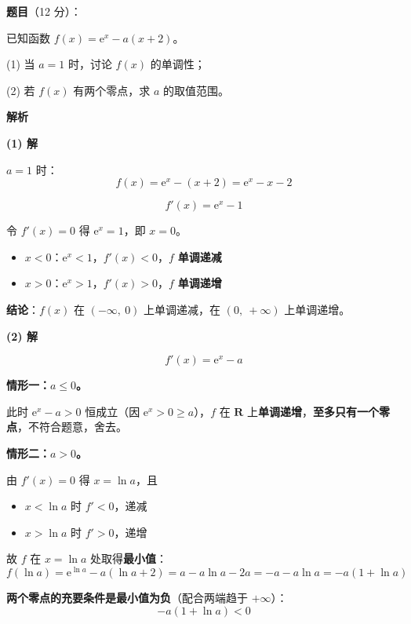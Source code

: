 \begin{answer}

\textbf{题目}（12 分）：

已知函数 $f(x)=\mathrm e^{x}-a(x+2)$。

  (1) 当 $a=1$ 时，讨论 $f(x)$ 的单调性；

  (2) 若 $f(x)$ 有两个零点，求 $a$ 的取值范围。

\textbf{解析}

\par\medskip

\textbf{(1) 解}

$a=1$ 时：
\nopagebreak[4]
\[f(x)=\mathrm e^{x}-(x+2)=\mathrm e^{x}-x-2\]

\nopagebreak[4]
\[f'(x)=\mathrm e^{x}-1\]

令 $f'(x)=0$ 得 $\mathrm e^{x}=1$，即 $x=0$。

\begin{itemize}
\item $x<0$：$\mathrm e^{x}<1$，$f'(x)<0$，$f$ \textbf{单调递减}
\item $x>0$：$\mathrm e^{x}>1$，$f'(x)>0$，$f$ \textbf{单调递增}
\end{itemize}

\textbf{结论}：$f(x)$ 在 $(-\infty,\ 0)$ 上单调递减，在 $(0,\ +\infty)$ 上单调递增。

\par\medskip

\textbf{(2) 解}

\nopagebreak[4]
\[f'(x)=\mathrm e^{x}-a\]

\textbf{情形一：$a\le0$。}

此时 $\mathrm e^{x}-a>0$ 恒成立（因 $\mathrm e^{x}>0\ge a$），$f$ 在 $\mathbf R$ 上\textbf{单调递增}，\textbf{至多只有一个零点}，不符合题意，舍去。

\textbf{情形二：$a>0$。}

由 $f'(x)=0$ 得 $x=\ln a$，且
\begin{itemize}
\item $x<\ln a$ 时 $f'<0$，递减
\item $x>\ln a$ 时 $f'>0$，递增
\end{itemize}

故 $f$ 在 $x=\ln a$ 处取得\textbf{最小值}：
\nopagebreak[4]
\[f(\ln a)=\mathrm e^{\ln a}-a(\ln a+2)=a-a\ln a-2a=-a-a\ln a=-a\left(1+\ln a\right)\]

\textbf{两个零点的充要条件是最小值为负}（配合两端趋于 $+\infty$）：
\nopagebreak[4]
\[-a\left(1+\ln a\right)<0\]


\end{answer}

